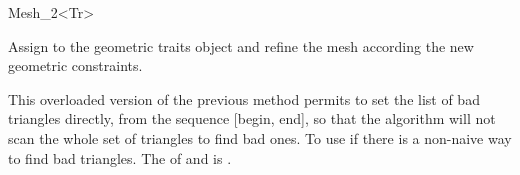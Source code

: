 \begin{ccRefClass}{Mesh_2<Tr>}
\ccOperations

{ Assign  to the geometric traits object and refine the mesh
  according the new geometric constraints.}

{ This overloaded version of the previous method permits to set the
  list of bad triangles directly, from the sequence [begin, end], so
  that the algorithm will not scan the whole set of triangles to find
  bad ones. To use if there is a non-naive way to find bad triangles.
  \ccPrecond The  of  and  is
  .}


\end{ccRefClass}
